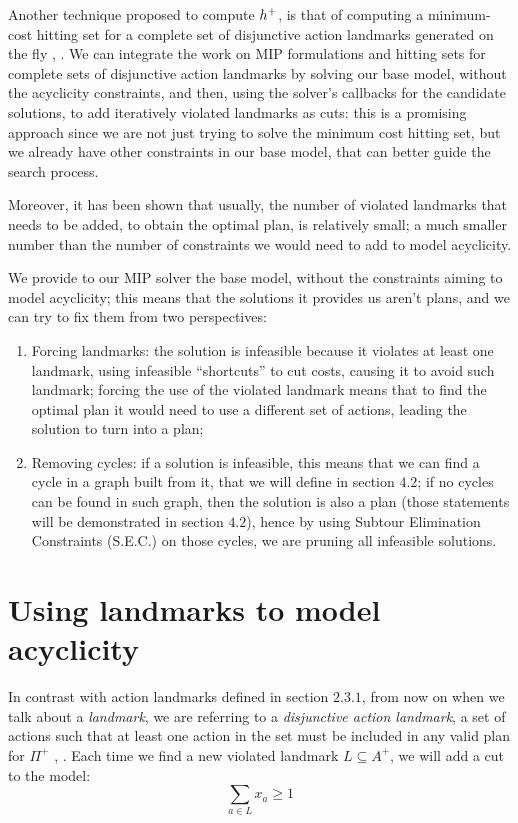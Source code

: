 Another technique proposed to compute $h^+$, is that of computing a minimum-cost hitting set for a complete set of disjunctive action landmarks generated on the fly \cite{Bonet_11}, \Cite{MLM_Haslum_12}. We can integrate the work on MIP formulations and hitting sets for complete sets of disjunctive action landmarks by solving our base model, without the acyclicity constraints, and then, using the solver's callbacks for the candidate solutions, to add iteratively violated landmarks as cuts: this is a promising approach since we are not just trying to solve the minimum cost hitting set, but we already have other constraints in our base model, that can better guide the search process.

Moreover, it has been shown \cite{MLM_Haslum_12} that usually, the number of violated landmarks that needs to be added, to obtain the optimal plan, is relatively small; a much smaller number than the number of constraints we would need to add to model acyclicity.

We provide to our MIP solver the base model, without the constraints aiming to model acyclicity; this means that the solutions it provides us aren't plans, and we can try to fix them from two perspectives:
\begin{enumerate}
    \item Forcing landmarks: the solution is infeasible because it violates at least one landmark, using infeasible ``shortcuts'' to cut costs, causing it to avoid such landmark; forcing the use of the violated landmark means that to find the optimal plan it would need to use a different set of actions, leading the solution to turn into a plan;
    \item Removing cycles: if a solution is infeasible, this means that we can find a cycle in a graph built from it, that we will define in section $4.2$; if no cycles can be found in such graph, then the solution is also a plan (those statements will be demonstrated in section $4.2$), hence by using Subtour Elimination Constraints (S.E.C.) on those cycles, we are pruning all infeasible solutions.
\end{enumerate}

\section{Using landmarks to model acyclicity}
In contrast with action landmarks defined in section $2.3.1$, from now on when we talk about a \textit{landmark}, we are referring to a \textit{disjunctive action landmark}, a set of actions such that at least one action in the set must be included in any valid plan for $\Pi^+$ \cite{Bonet_11}, \cite{MLM_Haslum_12}. Each time we find a new violated landmark $L\subseteq A^+$, we will add a cut to the model:
$$\sum_{a\in L}x_a\geq 1$$

